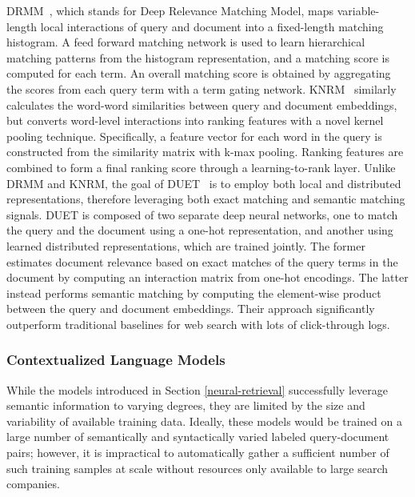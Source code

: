 DRMM~\cite{guo2017drmm}, which stands for Deep Relevance Matching Model, maps variable-length local interactions of query and document into a fixed-length matching histogram.
A feed forward matching network is used to learn hierarchical matching patterns from the histogram representation, and a matching score is computed for each term.
An overall matching score is obtained by aggregating the scores from each query term with a term gating network.
KNRM~\cite{xiong2017knrm} similarly calculates the word-word similarities between query and document embeddings, but converts word-level interactions into ranking features with a novel kernel pooling technique.
Specifically, a feature vector for each word in the query is constructed from the similarity matrix with k-max pooling.
Ranking features are combined to form a final ranking score through a learning-to-rank layer.
Unlike DRMM and KNRM, the goal of DUET~\cite{mitra2017learning} is to employ both local and distributed representations, therefore leveraging both exact matching and semantic matching signals.
DUET is composed of two separate deep neural networks, one to match the query and the document using a one-hot representation, and another using learned distributed representations, which are trained jointly.
The former estimates document relevance based on exact matches of the query terms in the document by computing an interaction matrix from one-hot encodings.
The latter instead performs semantic matching by computing the element-wise product between the query and document embeddings.
Their approach significantly outperform traditional baselines for web search with lots of click-through logs.

\subsubsection{Contextualized Language Models}

While the models introduced in Section \ref{neural-retrieval} successfully leverage semantic information to varying degrees, they are limited by the size and variability of available training data.
Ideally, these models would be trained on a large number of semantically and syntactically varied labeled query-document pairs; however, it is impractical to automatically gather a sufficient number of such training samples at scale without resources only available to large search companies.

